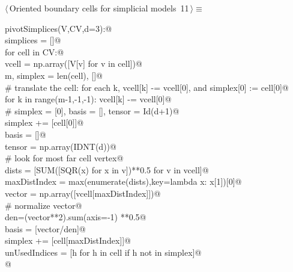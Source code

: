 \documentclass[11pt,oneside]{article}	%
\begin{document}
\begin{flushleft} \small
\begin{minipage}{\linewidth} \label{scrap23}
\protect{}$\langle\,$Oriented boundary cells for simplicial models\nobreak\ {\footnotesize 11}$\,\rangle\equiv$
\vspace{-1ex}
\begin{list}{}{} \item
\mbox{}\verb@def pivotSimplices(V,CV,d=3):@\\
\mbox{}\verb@   simplices = []@\\
\mbox{}\verb@   for cell in CV:@\\
\mbox{}\verb@      vcell = np.array([V[v] for v in cell])@\\
\mbox{}\verb@      m, simplex = len(cell), []@\\
\mbox{}\verb@      # translate the cell: for each k, vcell[k] -= vcell[0], and simplex[0] := cell[0]@\\
\mbox{}\verb@      for k in range(m-1,-1,-1): vcell[k] -= vcell[0]@\\
\mbox{}\verb@      # simplex = [0], basis = [], tensor = Id(d+1)@\\
\mbox{}\verb@      simplex += [cell[0]]@\\
\mbox{}\verb@      basis = []@\\
\mbox{}\verb@      tensor = np.array(IDNT(d))@\\
\mbox{}\verb@      # look for most far cell vertex@\\
\mbox{}\verb@      dists = [SUM([SQR(x) for x in v])**0.5 for v in vcell]@\\
\mbox{}\verb@      maxDistIndex = max(enumerate(dists),key=lambda x: x[1])[0]@\\
\mbox{}\verb@      vector = np.array([vcell[maxDistIndex]])@\\
\mbox{}\verb@      # normalize vector@\\
\mbox{}\verb@      den=(vector**2).sum(axis=-1) **0.5@\\
\mbox{}\verb@      basis = [vector/den]@\\
\mbox{}\verb@      simplex += [cell[maxDistIndex]]@\\
\mbox{}\verb@      unUsedIndices = [h for h in cell if h not in simplex]@\\
\mbox{}\verb@      @\\

\end{list}
\end{minipage}
\end{flushleft}
\end{document}
